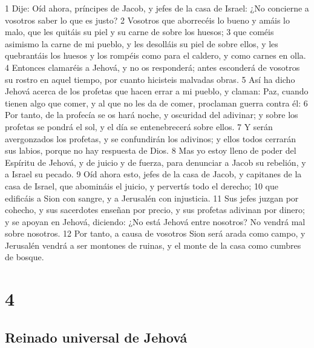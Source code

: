 1 Dije: Oíd ahora, príncipes de Jacob, y jefes de la casa de Israel: ¿No concierne a vosotros saber lo que es justo?
2 Vosotros que aborrecéis lo bueno y amáis lo malo, que les quitáis su piel y su carne de sobre los huesos; 
3 que coméis asimismo la carne de mi pueblo, y les desolláis su piel de sobre ellos, y les quebrantáis los huesos y los rompéis como para el caldero, y como carnes en olla.
4 Entonces clamaréis a Jehová, y no os responderá; antes esconderá de vosotros su rostro en aquel tiempo, por cuanto hicisteis malvadas obras.
5 Así ha dicho Jehová acerca de los profetas que hacen errar a mi pueblo, y claman: Paz, cuando tienen algo que comer, y al que no les da de comer, proclaman guerra contra él:
6 Por tanto, de la profecía se os hará noche, y oscuridad del adivinar; y sobre los profetas se pondrá el sol, y el día se entenebrecerá sobre ellos.
7 Y serán avergonzados los profetas, y se confundirán los adivinos; y ellos todos cerrarán sus labios, porque no hay respuesta de Dios.
8 Mas yo estoy lleno de poder del Espíritu de Jehová, y de juicio y de fuerza, para denunciar a Jacob su rebelión, y a Israel su pecado.
9 Oíd ahora esto, jefes de la casa de Jacob, y capitanes de la casa de Israel, que abomináis el juicio, y pervertís todo el derecho;
10 que edificáis a Sion con sangre, y a Jerusalén con injusticia.
11 Sus jefes juzgan por cohecho, y sus sacerdotes enseñan por precio, y sus profetas adivinan por dinero; y se apoyan en Jehová, diciendo: ¿No está Jehová entre nosotros? No vendrá mal sobre nosotros.
12 Por tanto, a causa de vosotros Sion será arada como campo, y Jerusalén vendrá a ser montones de ruinas, y el monte de la casa como cumbres de bosque. 

\chapter{4}

\section*{Reinado universal de Jehová}

